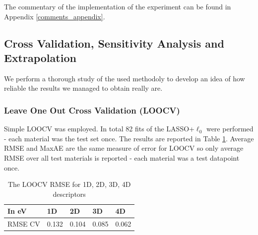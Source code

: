 \documentclass[11pt,oneside,czech,american]{book} %
\theoremstyle{definition} %
\theoremstyle{definition}
\begin{document}
The commentary of the implementation of the experiment can be found in Appendix \ref{comments_appendix}.

\subsection{Cross Validation, Sensitivity Analysis and Extrapolation}
We perform a thorough study of the used methodoly to develop an idea of how reliable the results we managed to obtain really are.

\subsubsection{Leave One Out Cross Validation (LOOCV)}
Simple LOOCV was employed. In total 82 fits of the LASSO+$\ell_{0}$ were performed - each material was the test set once. The results are reported in Table \ref{RMSE_LOOCV}. Average RMSE and MaxAE are the same measure of error for LOOCV so only average RMSE over all test materials is reported - each material was a test datapoint once.
\begin{table}[H]
	\centering
	\begin{tabular}{lllll} 
		\hline
		In eV  & 1D   & 2D  & 3D   & 4D    \\ 
		\hline
		RMSE CV   & 0.132 & 0.104 & 0.085 & 0.062  \\
		\hline
	\end{tabular}
	\caption{The LOOCV RMSE for 1D, 2D, 3D, 4D descriptors}
	\label{RMSE_LOOCV}
\end{table}
\end{document}
